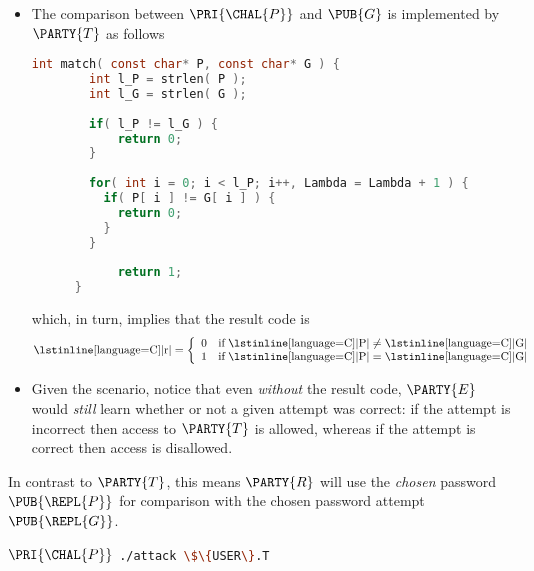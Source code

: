 \begin{itemize}
\item The comparison between $\PRI{\CHAL{P}}$ and $\PUB{G}$ is implemented 
      by 
      $\PARTY{T}$ 
      as follows

      \begin{lstlisting}[language={C},gobble={6},frame={single},basicstyle={\ttfamily\small}]
      int match( const char* P, const char* G ) {
        int l_P = strlen( P );
        int l_G = strlen( G );
      
        if( l_P != l_G ) {
            return 0;
        }
      
        for( int i = 0; i < l_P; i++, Lambda = Lambda + 1 ) {
          if( P[ i ] != G[ i ] ) {
            return 0;
          }
        }
      
            return 1;
      }
      \end{lstlisting}

      \noindent
      which, in turn, implies that the result code is
      \[
      \mbox{\lstinline[language={C}]|r|} = \left\{\begin{array}{c l@{\;}c@{\;}c@{\;}c}
                                                  0 & \mbox{if} & \mbox{\lstinline[language={C}]|P|} &\neq& \mbox{\lstinline[language={C}]|G|} \\
                                                  1 & \mbox{if} & \mbox{\lstinline[language={C}]|P|} &=   & \mbox{\lstinline[language={C}]|G|} \\
                                                  \end{array}
                                           \right.
      \]
\item Given the scenario, notice that even {\em without} the result code,
      $\PARTY{E}$ 
      would {\em still} learn whether or not a given attempt was correct: 
      if the attempt is incorrect then access to $\PARTY{T}$ is    allowed,
      whereas
      if the attempt is   correct then access                is disallowed.
\end{itemize}


%
In contrast to 
$\PARTY{T}$, 
this means 
$\PARTY{R}$ 
will use the
{\em chosen} password         $\PUB{\REPL{P}}$
for comparison with the
     chosen  password attempt $\PUB{\REPL{G}}$.



      \DESCTASKIMPL
      {$\PRI{\CHAL{P}}$}
      {\mbox{\lstinline[language={bash}]|./attack \$\{USER\}.T|}}

